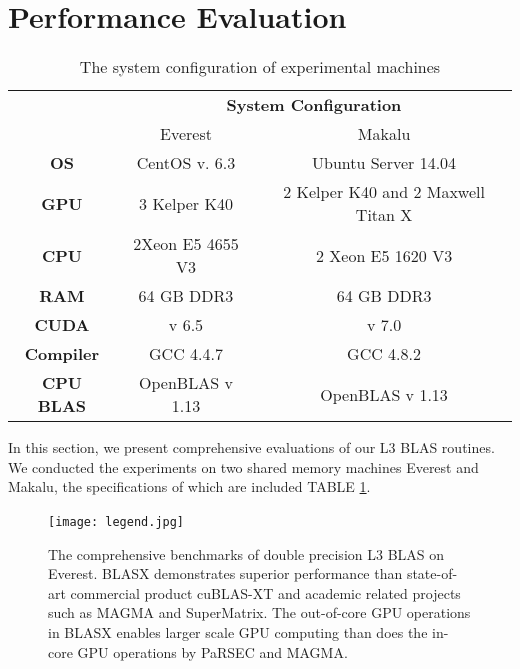 \documentclass[conference]{IEEEtran}
\begin{document}
\section{Performance Evaluation}
\begin{table}[!t]
\caption{The system configuration of experimental machines}
\label{Machines}
\centering
\begin{tabular}{c c c}
    \toprule
    &\multicolumn{2}{c}{\textbf{System Configuration}}\\
    \cline{2-3}
                 &      Everest            &      Makalu              \\  \midrule
    \textbf{OS}  &      CentOS v. 6.3     &      Ubuntu Server 14.04                \\
    \textbf{GPU} &      3 Kelper K40      &      2 Kelper K40 and 2 Maxwell Titan X \\
    \textbf{CPU} &      2Xeon E5 4655 V3 &      2 Xeon E5 1620 V3                  \\
    \textbf{RAM} &      64 GB DDR3        &      64 GB DDR3                         \\ 
    \textbf{CUDA}&      v 6.5             &      v 7.0                              \\
    \textbf{Compiler}   &      GCC 4.4.7         &      GCC 4.8.2                          \\
    \textbf{CPU BLAS}   &      OpenBLAS v 1.13   &      OpenBLAS v 1.13                    \\
    \bottomrule
\end{tabular}
\vspace{-0.12in}
\end{table}

In this section, we present comprehensive evaluations of our L3 BLAS routines.
We conducted the experiments on two shared memory machines Everest and Makalu, the specifications 
of which are included TABLE \ref{Machines}.

\clearpage
\begin{figure*}[t]
\centering
\texttt{[image: legend.jpg]}
\mbox{
}
\hfil
\mbox{
}
\hfil
\mbox{
}
\caption{The comprehensive benchmarks of double precision L3 BLAS on Everest. BLASX
demonstrates superior performance than state-of-art commercial product cuBLAS-XT and academic 
related projects such as MAGMA and SuperMatrix. The out-of-core GPU operations in BLASX enables 
larger scale GPU computing than does the in-core GPU operations by PaRSEC and MAGMA. }
\label{benchmark}
\end{figure*}
\clearpage
\end{document}
